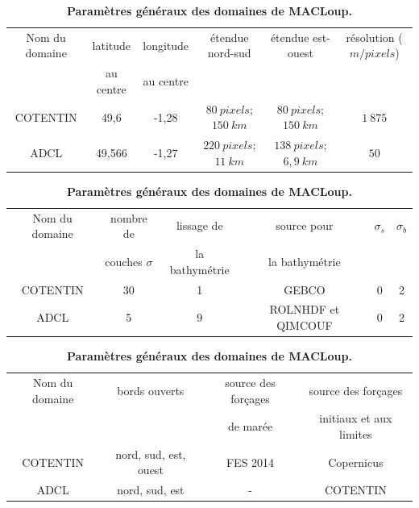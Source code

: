 \documentclass[10pt,a4paper,titlepage]{article}
\begin{document}
    
\begin{table}[h!]
    \caption{
        \textbf{Paramètres généraux des domaines de MACLoup.}
    }
    \begin{tabular}{||c||c|c|c|c|c|}
        \hline
        Nom du domaine & latitude & longitude & étendue nord-sud & étendue est-ouest & résolution ($m/pixels$)\\
        & au centre & au centre &  &  & \\
        \hline
        COTENTIN & 49,6 & -1,28 & $80~pixels$; $150~km$ & $80~pixels$; $150~km$ & $1~875$\\
        ADCL & 49,566 & -1,27 & $220~pixels$; $11~km$ & $138~pixels$; $6,9~km$ & $50$\\
        \hline
    \end{tabular}\newline
    
    \begin{tabular}{||c||c|c|c|c|c|}
        \hline
        Nom du domaine & nombre de & lissage de & source pour  &$\sigma_{s}$ & $\sigma_{b}$ \\
        & couches $\sigma$ & la bathymétrie & la bathymétrie  & & \\
        \hline
        COTENTIN & 30 & 1 & GEBCO & 0  & 2 \\
        ADCL & 5 & 9 & ROLNHDF et QIMCOUF & 0 & 2 \\
        \hline
    \end{tabular}\newline
    
    \begin{tabular}{||c||c|c|c|}
        \hline
        Nom du domaine & bords ouverts & source des forçages & source des forçages \\
        &  & de marée & initiaux et aux limites \\
        \hline
        COTENTIN & nord, sud, est, ouest & FES 2014 & Copernicus \\
        ADCL & nord, sud, est & - & COTENTIN \\
        \hline
    \end{tabular}
    \label{table:param_generaux}
\end{table}

\end{document}
